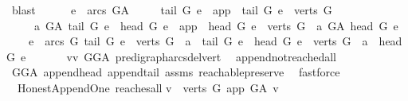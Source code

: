 \begin{isabellebody}
\ blast\ \ \isanewline
\ \ \isamarkupfalse%
\ {\isachardoublequoteopen}{\isacharbraceleft}{\kern0pt}e\ {\isasymin}\ arcs\ G{\isacharunderscore}{\kern0pt}A{\isachardot}{\kern0pt}\isanewline
\ \ \ \ \ {\isacharparenleft}{\kern0pt}tail\ G\ e\ {\isacharequal}{\kern0pt}\ app\ {\isasymor}\ tail\ G\ e\ {\isasymin}\ verts\ G{\isacharparenright}{\kern0pt}\ {\isasymand}\isanewline
\ \ \ \ \ a\ {\isasymrightarrow}\isactrlsup {\isacharplus}{\kern0pt}\isactrlbsub G{\isacharunderscore}{\kern0pt}A\isactrlesub \ tail\ G\ e\ {\isasymand}\ {\isacharparenleft}{\kern0pt}head\ G\ e\ {\isacharequal}{\kern0pt}\ app\ {\isasymor}\ head\ G\ e\ {\isasymin}\ verts\ G{\isacharparenright}{\kern0pt}\ {\isasymand}\ a\ {\isasymrightarrow}\isactrlsup {\isacharplus}{\kern0pt}\isactrlbsub G{\isacharunderscore}{\kern0pt}A\isactrlesub \ head\ G\ e{\isacharbraceright}{\kern0pt}\ {\isacharequal}{\kern0pt}\isanewline
\ \ \ \ {\isacharbraceleft}{\kern0pt}e\ {\isasymin}\ arcs\ G{\isachardot}{\kern0pt}\ tail\ G\ e\ {\isasymin}\ verts\ G\ {\isasymand}\ a\ {\isasymrightarrow}\isactrlsup {\isacharplus}{\kern0pt}\ tail\ G\ e\ {\isasymand}\ head\ G\ e\ {\isasymin}\ verts\ G\ {\isasymand}\ a\ {\isasymrightarrow}\isactrlsup {\isacharplus}{\kern0pt}\ head\ G\ e{\isacharbraceright}{\kern0pt}\ {\isachardoublequoteclose}\isanewline
\ \ \ \ \isamarkupfalse%
\ vv\ GG{\isacharunderscore}{\kern0pt}A\ pre{\isacharunderscore}{\kern0pt}digraph{\isachardot}{\kern0pt}arcs{\isacharunderscore}{\kern0pt}del{\isacharunderscore}{\kern0pt}vert\ \isamarkupfalse%
\ append{\isacharunderscore}{\kern0pt}not{\isacharunderscore}{\kern0pt}reached{\isacharunderscore}{\kern0pt}all\isanewline
\ \ \ \ \isamarkupfalse%
\ GG{\isacharunderscore}{\kern0pt}A\ append{\isacharunderscore}{\kern0pt}head\ append{\isacharunderscore}{\kern0pt}tail\ assms\ reachable{}{\isacharunderscore}{\kern0pt}preserve\ \isamarkupfalse%
\ fastforce\ \isanewline
{}\isamarkupfalse%
%
\endisatagproof
{\isafoldproof}%
%
\isadelimproof
%
\endisadelimproof
%
\isadelimdocument
%
\endisadelimdocument
%
\isatagdocument
%
\isamarkuptrue%
%
\endisatagdocument
{\isafolddocument}%
%
\isadelimdocument
%
\endisadelimdocument
{}\isamarkupfalse%
\ {\isacharparenleft}{\kern0pt}\ Honest{\isacharunderscore}{\kern0pt}Append{\isacharunderscore}{\kern0pt}One{\isacharparenright}{\kern0pt}\ reaches{\isacharunderscore}{\kern0pt}all{\isacharcolon}{\kern0pt}\isanewline
{\isachardoublequoteopen}{\isasymforall}v\ {\isasymin}\ verts\ G{\isachardot}{\kern0pt}\ app\ {\isasymrightarrow}\isactrlsup {\isacharplus}{\kern0pt}\isactrlbsub G{\isacharunderscore}{\kern0pt}A\isactrlesub \ v{\isachardoublequoteclose}\ \ \isanewline

\end{isabellebody}
